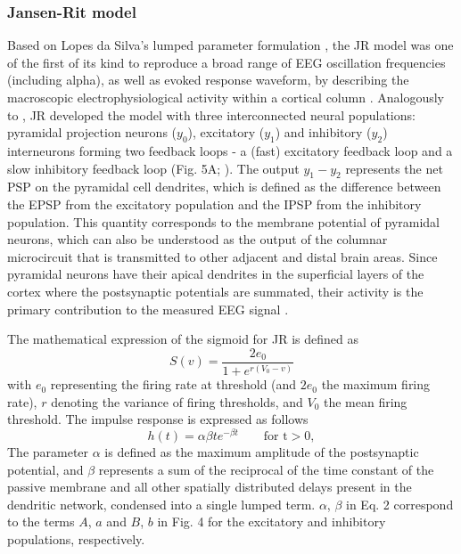 \documentclass[12pt,twoside]{article}
\begin{document}
\subsubsection{Jansen-Rit model}
Based on Lopes da Silva’s lumped parameter formulation \citep{lopes1974model}, the JR model was one of the first of its kind to reproduce a broad range of EEG oscillation frequencies (including alpha), as well as evoked response waveform, by describing the macroscopic electrophysiological activity within a cortical column \citep{jansen1993neurophysiologically, jansen1995electroencephalogram}. Analogously to \citet{zetterberg1978performance}, JR developed the model with three interconnected neural populations: pyramidal projection neurons ($y_0$), excitatory ($y_1$) and inhibitory ($y_2$) interneurons forming two feedback loops - a (fast) excitatory feedback loop and a slow inhibitory feedback loop (Fig. 5A; \citealp{Knösche2015}). The output  $y_1-y_2$ represents the net PSP on the pyramidal cell dendrites, which is defined as the difference between the EPSP from the excitatory population and the IPSP from the inhibitory population. This quantity corresponds to the membrane potential of pyramidal neurons, which can also be understood as the output of the columnar microcircuit that is transmitted to other adjacent and distal brain areas. Since pyramidal neurons have their apical dendrites in the superficial layers of the cortex where the postsynaptic potentials are summated, their activity is the primary contribution to the measured EEG signal \citep{jansen1995electroencephalogram, grimbert2006analysis}.  

The mathematical expression of the sigmoid for JR is defined as
\begin{equation}
     S(v)=\frac{2e_0}{1+e^{r(V_0-v)}}
 \end{equation}
 with $e_{0}$ representing the firing rate at threshold (and $2e_{0}$ the maximum firing rate), $r$ denoting the variance of firing thresholds, and $V_{0}$ the mean firing threshold. The impulse response is expressed as follows
 \begin{equation}
   h(t)=\alpha \beta te^{-\beta t}    \qquad \text{for t} > 0, 
 \end{equation}
The parameter $\alpha$ is defined as the maximum amplitude of the postsynaptic potential, and $\beta$ represents a sum of the reciprocal of the time constant of the passive membrane and all other spatially distributed delays present in the dendritic network, condensed into a single lumped term. $\alpha$, $\beta$ in Eq. 2 correspond to the terms $A$, $a$ and $B$, $b$ in Fig. 4 for the excitatory and inhibitory populations, respectively.
\end{document}
